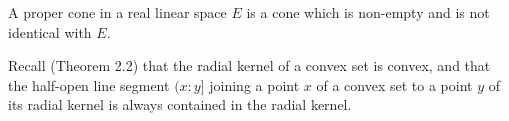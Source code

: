 A proper cone in a real linear space $E$ is a cone which is non-empty and is not identical with $E$.

Recall (Theorem 2.2) that the radial kernel of a convex set is convex, and that the half-open line segment $(x : y]$ joining a point $x$ of a convex set to a point $y$ of its radial kernel is always contained in the radial kernel.
